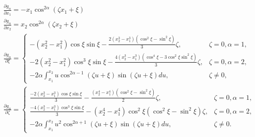 \documentclass[12pt]{article}
\begin{document}
\begin{subequations}
\begin{align}
&\frac{\partial g_{\alpha}}{\partial x_1}=-x_1\cos^{2\alpha}(\zeta x_1 +\xi)\label{eq:dgdx_1}\\
&\frac{\partial g_{\alpha}}{\partial x_2}=x_2\cos^{2\alpha}(\zeta x_2+\xi)\label{eq:dgdx_2}\\
&\frac{\partial g_{\alpha}}{\partial\xi}=
	\begin{cases}
	-(x_2^2-x_1^2)\cos\xi\sin\xi-\frac{2(x_2^3-x_1^3)(\cos^2\xi-\sin^2\xi)}{3}\zeta,	&\zeta=0,\alpha=1,\\
	-2(x_2^2-x_1^2)\cos^3\xi\sin\xi-\frac{4(x_2^3-x_1^3)(\cos^4\xi-3\cos^2\xi\sin^2\xi)}{3}\zeta,	&\zeta=0,\alpha=2,\\
	-2\alpha\int_{x_1}^{x_2} u\cos^{2\alpha-1}(\zeta u+\xi)\sin(\zeta u+\xi)du, &\zeta\neq0,\end{cases}\label{eq:dgdxi}\\
&\frac{\partial g_{\alpha}}{\partial\zeta}=
	\begin{cases}
	\frac{-2(x_2^3-x_1^3)\cos\xi\sin\xi}{3}-\frac{(x_2^4-x_1^4)(\cos^2\xi-\sin^2\xi)}{2}\zeta,	&\zeta=0,\alpha=1,\\
	\frac{-4(x_2^3-x_1^3)\cos^3\xi\sin\xi}{3}-(x_2^4-x_1^4)\cos^2\xi(\cos^2\xi-\sin^2\xi)\zeta,	&\zeta=0,\alpha=2,\\
	-2\alpha\int_{x_1}^{x_2} u^2\cos^{2\alpha+1}(\zeta u +\xi)\sin(\zeta u+\xi)du,	&\zeta\neq0.\end{cases}\label{eq:dgdzeta}
\end{align}
\end{subequations}

	
\clearpage


\end{document}
